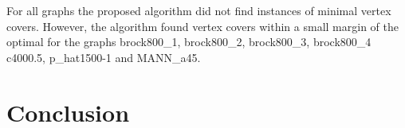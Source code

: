 \documentclass[conference,letterpaper]{IEEEtran}
\begin{document}
\par For all graphs the proposed algorithm did not find instances of minimal vertex covers. However, the algorithm found vertex covers within a small margin of the optimal for the graphs brock800\_1, brock800\_2, brock800\_3, brock800\_4 c4000.5, p\_hat1500-1 and MANN\_a45.

\section{Conclusion}

\newpage




%
%
\end{document}
